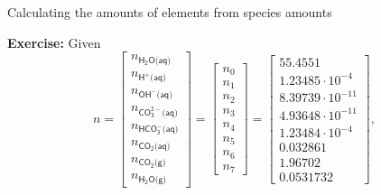 %
\begin{frame}{Calculating the amounts of elements from species amounts}

\vskip 10pt
\lcol[0.7]

\alert{\textbf{Exercise:}} Given 
\[
n=\left[\begin{array}{l}
n_{\mathsf{H_{2}O\text{(}aq\text{)}}}\\
n_{\mathsf{H^{+}\text{(}aq\text{)}}}\\
n_{\mathsf{OH^{-}\text{(}aq\text{)}}}\\
n_{\mathsf{CO_{3}^{2-}\text{(}aq\text{)}}}\\
n_{\mathsf{HCO_{3}^{-}\text{(}aq\text{)}}}\\
n_{\mathsf{CO_{2}\text{(}aq\text{)}}}\\
n_{\mathsf{CO_{2}\text{(}g\text{)}}}\\
n_{\mathsf{H_{2}O\text{(}g\text{)}}}
\end{array}\right]=\begin{bmatrix}n_{0}\\
n_{1}\\
n_{2}\\
n_{3}\\
n_{4}\\
n_{5}\\
n_{6}\\
n_{7}
\end{bmatrix}=\begin{bmatrix}55.4551\\
1.23485\cdot10^{-4}\\
8.39739\cdot10^{-11}\\
4.93648\cdot10^{-11}\\
1.23484\cdot10^{-4}\\
0.032861\\
1.96702\\
0.0531732
\end{bmatrix},
\]


\end{frame}
